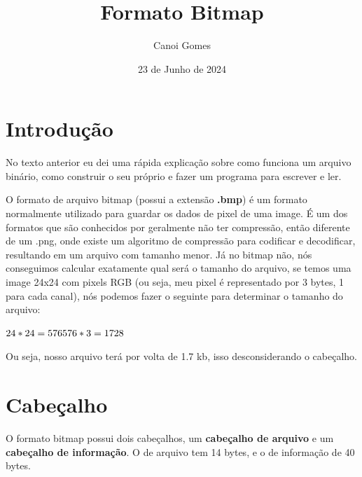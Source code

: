 \documentclass[a4paper,oneside,12pt]{article}
\title{Formato Bitmap}
\author{Canoi Gomes}
\date{23 de Junho de 2024}
\begin{document}
\maketitle
\newpage
\tableofcontents
\newpage
\section{Introdução}

No texto anterior eu dei uma rápida explicação sobre como funciona um arquivo binário, como construir o seu próprio e fazer um programa para escrever e ler.

O formato de arquivo bitmap (possui a extensão \textbf{.bmp}) é um formato normalmente utilizado para guardar os dados de pixel de uma image. É um dos formatos que são conhecidos por geralmente não ter compressão, então diferente de um .png, onde existe um algoritmo de compressão para codificar e decodificar, resultando em um arquivo com tamanho menor. Já no bitmap não, nós conseguimos calcular exatamente qual será o tamanho do arquivo, se temos uma image 24x24 com pixels RGB (ou seja, meu pixel é representado por 3 bytes, 1 para cada canal), nós podemos fazer o seguinte para determinar o tamanho do arquivo:

\noindent
$
24 * 24 = 576\\
576 * 3 = 1728
$

Ou seja, nosso arquivo terá por volta de 1.7 kb, isso desconsiderando o cabeçalho.

\section{Cabeçalho}

O formato bitmap possui dois cabeçalhos, um \textbf{cabeçalho de arquivo} e um \textbf{cabeçalho de informação}. O de arquivo tem 14 bytes, e o de informação de 40 bytes.
\end{document}
